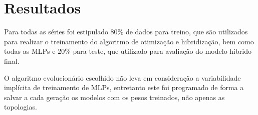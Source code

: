 \chapter{Resultados}
\label{cap:resultados}

Para todas as séries foi estipulado 80\% de dados para treino, que são utilizados para realizar o treinamento do algoritmo de otimização e hibridização, bem como todas as MLPs e 20\% para teste, que utilizado para avaliação do modelo híbrido final.

O algoritmo evolucionário escolhido não leva em consideração a variabilidade implícita de treinamento de MLPs, entretanto este foi programado de forma a salvar a cada geração os modelos com os pesos treinados, não apenas as topologias.
